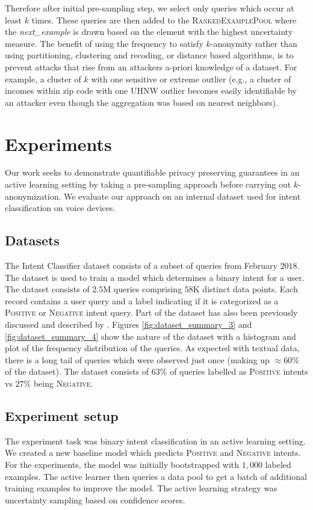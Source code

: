 \documentclass[letterpaper]{article}
\begin{document}
Therefore after initial pre-sampling step, we select only queries which occur at least $k$ times. These queries are then added to the \textsc{RankedExamplePool} where the \textit{next\_example} is drawn based on the element with the highest uncertainty measure. The benefit of using the frequency to satisfy $k$-anonymity rather than using partitioning, clustering and recoding, or distance based algorithms, is to prevent attacks that rise from an attackers a-priori knowledge of a dataset. For example, a cluster of $k$ with one sensitive or extreme outlier (e.g., a cluster of incomes within zip code with one UHNW outlier becomes easily identifiable by an attacker even though the aggregation was based on nearest neighbors).



\section{Experiments}

Our work seeks to demonstrate quantifiable privacy preserving guarantees in an active learning setting by taking a pre-sampling approach before carrying out $k$-anonymization. We evaluate our approach on an internal dataset used for intent classification on voice devices.

\subsection{Datasets}
The Intent Classifier dataset consists of a subset of queries from February $2018$. The dataset is used to train a model which determines a binary intent for a user. The dataset consists of $2.5$M queries comprising $58$K distinct data points. Each record contains a user query and a label indicating if it is categorized as a \textsc{Positive} or \textsc{Negative} intent query. Part of the dataset has also been previously discussed and described by \cite{yang2018leveraging}. Figures \ref{fig:dataset_summary_3} and \ref{fig:dataset_summary_4} show the nature of the dataset with a histogram and plot of the frequency distribution of the queries. As expected with textual data, there is a long tail of queries which were observed just once (making up $\approx 60\%$ of the dataset). The dataset consists of $63\%$ of queries labelled as \textsc{Positive} intents vs $27\%$ being \textsc{Negative}.


\subsection{Experiment setup}
The experiment task was binary intent classification in an active learning setting. We created a new baseline model which predicts \textsc{Positive} and \textsc{Negative} intents. For the experiments, the model was initially bootstrapped with $1,000$ labeled examples. The active learner then queries a data pool to get a batch of additional training examples to improve the model. The active learning strategy was uncertainty sampling based on confidence scores.
\end{document}

